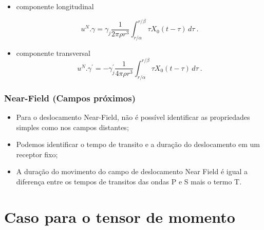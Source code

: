 \documentclass{beamer}
\begin{document}
\begin{frame}
	
	
	
\end{frame}

\begin{frame}
	\begin{itemize}
		\item componente longitudinal
		
		\begin{equation}
		u^{N}.\gamma= \gamma _{j}\frac{1}{2\pi\rho r^{3}}\int_{r/\alpha}^{r/\beta} \tau X_{0}(t-\tau) \,d\tau\ .
		\end{equation}
		
		\item componente transversal
		\begin{equation}
		u^{N}.\gamma^{'}= -\gamma^{'} _{j}\frac{1}{4\pi\rho r^{3}}\int_{r/\alpha}^{r/\beta} \tau X_{0}(t-\tau) \,d\tau\ .
		\end{equation}
	\end{itemize}
	
	
\end{frame}

\begin{frame}
	\frametitle {Near-Field (Campos próximos)}
	\begin{itemize}
		\item Para o deslocamento Near-Field, não é possível identificar as propriedades simples como nos campos distantes; 
		\item Podemos identificar o tempo de transito e a duração do deslocamento em um receptor fixo;
		\item A duração do movimento do campo de deslocamento Near Field é igual a diferença entre os tempos de transitos das ondas P e S mais o termo T.
	\end{itemize}
\end{frame}


\section{Caso para o tensor de momento}
\end{document}
